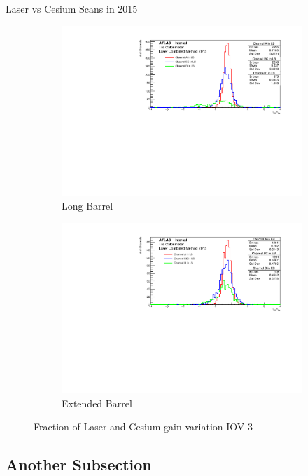 \documentclass{beamer}
\begin{document}
\begin{frame}{Laser vs Cesium Scans in 2015}
\begin{figure}[H]
\centering
\begin{subfigure} [t] {0.49\textwidth}
\includegraphics[width=\textwidth]{ratio_lb_iov3.pdf}
\caption{Long Barrel}
\end{subfigure}
\begin{subfigure} [t] {0.49\textwidth}
\includegraphics[width=\textwidth]{ratio_eb_iov3.pdf}
\caption{Extended Barrel}
\end{subfigure}
\caption{Fraction of Laser and Cesium gain variation IOV 3}
\end{figure}
\end{frame}

\subsection{Another Subsection}
\end{document}
